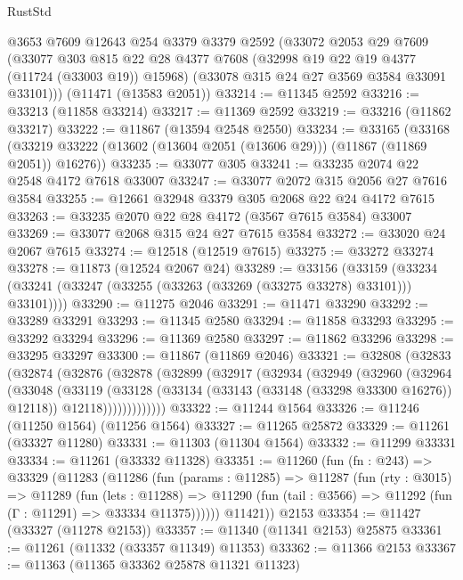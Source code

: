 \begin{lexlean}{RustStd}
\begin{coremodule}
    @3653
    @7609
    @12643
    @254
    @3379
    @3379
    @2592
    (@33072
      @2053
      @29
      @7609
      (@33077
        @303
        @815
        @22
        @28
        @4377
        @7608
        (@32998 @19 @22 @19 @4377 (@11724 (@33003 @19)) @15968)
        (@33078 @315 @24 @27 @3569 @3584 @33091 @33101)))
    (@11471 (@13583 @2051))
@33214 := @11345 @2592
@33216 := @33213 (@11858 @33214)
@33217 := @11369 @2592
@33219 := @33216 (@11862 @33217)
@33222 := @11867 (@13594 @2548 @2550)
@33234 := @33165
    (@33168 (@33219 @33222 (@13602 (@13604 @2051 (@13606 @29))) (@11867 (@11869 @2051)) @16276))
@33235 := @33077 @305
@33241 := @33235 @2074 @22 @2548 @4172 @7618 @33007
@33247 := @33077 @2072 @315 @2056 @27 @7616 @3584
@33255 := @12661 @32948 @3379 @305 @2068 @22 @24 @4172 @7615
@33263 := @33235 @2070 @22 @28 @4172 (@3567 @7615 @3584) @33007
@33269 := @33077 @2068 @315 @24 @27 @7615 @3584
@33272 := @33020 @24 @2067 @7615
@33274 := @12518 (@12519 @7615)
@33275 := @33272 @33274
@33278 := @11873 (@12524 @2067 @24)
@33289 := @33156
    (@33159 (@33234 (@33241 (@33247 (@33255 (@33263 (@33269 (@33275 @33278) @33101))) @33101))))
@33290 := @11275 @2046
@33291 := @11471 @33290
@33292 := @33289 @33291
@33293 := @11345 @2580
@33294 := @11858 @33293
@33295 := @33292 @33294
@33296 := @11369 @2580
@33297 := @11862 @33296
@33298 := @33295 @33297
@33300 := @11867 (@11869 @2046)
@33321 := @32808
    (@32833
      (@32874
        (@32876
          (@32878
            (@32899
              (@32917
                (@32934
                  (@32949
                    (@32960
                      (@32964
                        (@33048
                          (@33119
                            (@33128
                              (@33134 (@33143 (@33148 (@33298 @33300 @16276)) @12118))
                              @12118)))))))))))))
@33322 := @11244 @1564
@33326 := @11246 (@11250 @1564) (@11256 @1564)
@33327 := @11265 @25872
@33329 := @11261 (@33327 @11280)
@33331 := @11303 (@11304 @1564)
@33332 := @11299 @33331
@33334 := @11261 (@33332 @11328)
@33351 := @11260
    (fun (fn : @243) =>
    @33329
      (@11283
        (@11286
          (fun (params : @11285) =>
          @11287
            (fun (rty : @3015) =>
            @11289
              (fun (lets : @11288) =>
              @11290 (fun (tail : @3566) => @11292 (fun (Γ : @11291) => @33334 @11375))))))
        @11421))
    @2153
@33354 := @11427 (@33327 (@11278 @2153))
@33357 := @11340 (@11341 @2153) @25875
@33361 := @11261 (@11332 (@33357 @11349) @11353)
@33362 := @11366 @2153
@33367 := @11363 (@11365 @33362 @25878 @11321 @11323)

\end{coremodule}
\end{lexlean}
